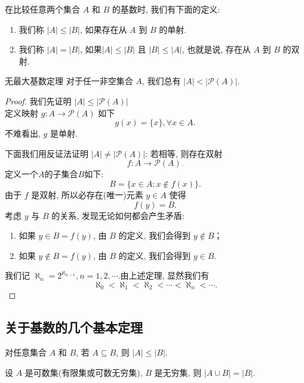 \documentclass[cn,toc=twocol]{elegantbook}
\newcommand{\ITEMS}{\begin{enumerate}}
\newcommand{\ITEME}{\end{enumerate}}
\begin{document}
在比较任意两个集合 $A$ 和 $B$ 的基数时, 我们有下面的定义: 
\begin{definition}
\ITEMS
	\item 我们称 $\lvert A \rvert \le \lvert B \rvert$, 如果存在从 $A$ 到 $B$ 的单射.
	\item 我们称 $\lvert A \rvert = \lvert B \rvert$, 如果$\lvert A \rvert \le \lvert B \rvert$ 且 $\lvert B \rvert \le \lvert A \rvert$, 也就是说, 存在从 $A$ 到 $B$ 的双射.
\ITEME
\end{definition}

\begin{theorem}{无最大基数定理}
对于任一非空集合 $A$, 我们总有 $\lvert A \rvert<\lvert \mathcal{P}(A) \rvert$.
\end{theorem}

\begin{proof}

我们先证明 $\lvert A \rvert \le \lvert \mathcal{P}(A) \rvert$\\
定义映射 $g:A\rightarrow \mathcal{P}(A)$ 如下
\[ 
	g(x)=\{x\},  \forall x \in A.
\] 
不难看出, $g$ 是单射.

下面我们用反证法证明 $\lvert A \rvert \ne \lvert \mathcal{P}(A) \rvert$:
若相等, 则存在双射
\[
	f:A\rightarrow \mathcal{P}(A).
\]
定义一个$A$的子集合$B$如下: 
\[
B = \{x\in A: x\notin f(x)\}.
\]
由于 $f$ 是双射, 所以必存在(唯一)元素 $y\in A$ 使得
\[
f(y) = B.
\]
考虑 $y$ 与 $B$ 的关系, 发现无论如何都会产生矛盾: 
\ITEMS
	\item 如果 $y\in B=f(y)$,  由 $B$ 的定义, 我们会得到 $y\notin B$；
	\item 如果 $y\notin B=f(y)$,  由 $B$ 的定义, 我们会得到 $y\in B$.
\ITEME

我们记 $\aleph_n=2^{\aleph_{n-1}},  n=1,  2,  \cdots$.由上述定理, 显然我们有 
\[
	\aleph_0 < \aleph_1 < \aleph_2 <\cdots< \aleph_n< \cdots.
\]
\end{proof}
\smallskip

\subsection{关于基数的几个基本定理}
\begin{theorem}
	对任意集合 $A$ 和 $B$, 若 $A\subseteq B$, 则 $\lvert A \rvert \le \lvert B \rvert$.
\end{theorem}

\begin{theorem}
	设 $A$ 是可数集(有限集或可数无穷集), $B$ 是无穷集, 则 $\lvert A\cup B \rvert= \lvert B \rvert$.
\end{theorem}
	
\end{document}
